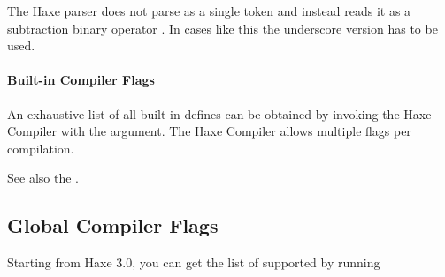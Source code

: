 The Haxe parser does not parse  as a single token and instead reads it as a subtraction binary operator . In cases like this the underscore version  has to be used.


\paragraph{Built-in Compiler Flags}
An exhaustive list of all built-in defines can be obtained by invoking the Haxe Compiler with the  argument. The Haxe Compiler allows multiple  flags per compilation.

See also the .

\subsection{Global Compiler Flags}
\label{lf-condition-compilation-flags}

Starting from Haxe 3.0, you can get the list of supported  by running 

